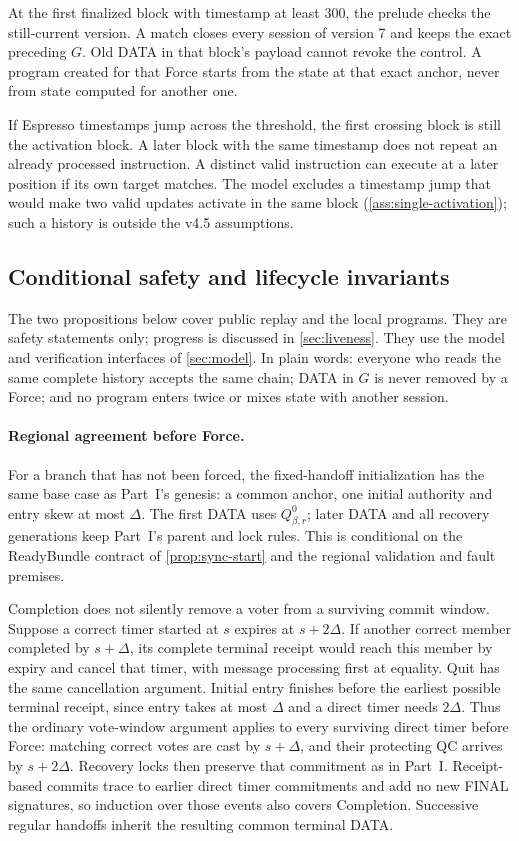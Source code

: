 \documentclass[11pt,a4paper]{article}
\begin{document}
At the first finalized block with timestamp at least 300, the prelude
checks the still-current version. A match closes every session of
version 7 and keeps the exact preceding $G$. Old DATA in that block's
payload cannot revoke the control. A program created for that
Force starts from the state at that exact anchor, never from state
computed for another one.

If Espresso timestamps jump across the threshold, the first crossing
block is still the activation block. A later block with the same
timestamp does not repeat an already processed instruction. A distinct
valid instruction can execute at a later position if its own target
matches. The model excludes a timestamp jump that would make two valid
updates activate in the same block (\cref{ass:single-activation}); such a
history is outside the v4.5 assumptions.

\subsection{Conditional safety and lifecycle invariants}
\label{sec:safety-argument}
The two propositions below cover public replay and the local programs.
They are safety statements only; progress is discussed in
\cref{sec:liveness}. They use the model and verification interfaces of
\cref{sec:model}. In plain words: everyone who reads the same complete
history accepts the same chain; DATA in $G$ is never removed by a Force;
and no program enters twice or mixes state with another session.

\paragraph{Regional agreement before Force.}
For a branch that has not been forced, the fixed-handoff initialization
has the same base case as Part~I's genesis: a common anchor, one
initial authority and entry skew at most $\Delta$. The first DATA uses
$Q^0_{\beta,r}$; later DATA and all recovery generations keep Part~I's
parent and lock rules. This is conditional on the ReadyBundle contract
of \cref{prop:sync-start} and the regional validation and fault premises.

Completion does not silently remove a voter from a surviving commit
window. Suppose a correct timer started at $s$ expires at $s+2\Delta$.
If another correct member completed by $s+\Delta$, its complete terminal
receipt would reach this member by expiry and cancel that timer, with
message processing first at equality. Quit has the same cancellation
argument. Initial entry finishes before the earliest possible terminal
receipt, since entry takes at most $\Delta$ and a direct timer needs
$2\Delta$. Thus the ordinary vote-window argument applies to every
surviving direct timer before Force: matching correct votes are cast by
$s+\Delta$, and their protecting QC arrives by $s+2\Delta$. Recovery
locks then preserve that commitment as in Part~I. Receipt-based commits
trace to earlier direct timer commitments and add no new FINAL
signatures, so induction over those events also covers Completion.
Successive regular handoffs inherit the resulting common terminal DATA.
\end{document}
